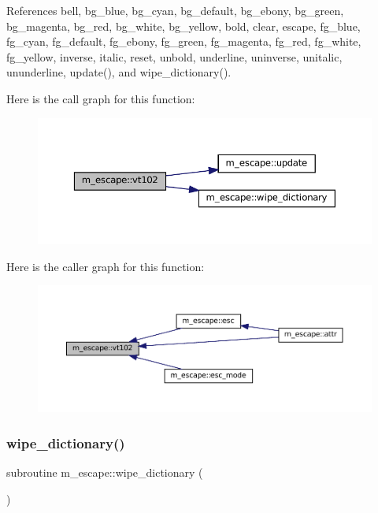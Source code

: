 References bell, bg\+\_\+blue, bg\+\_\+cyan, bg\+\_\+default, bg\+\_\+ebony, bg\+\_\+green, bg\+\_\+magenta, bg\+\_\+red, bg\+\_\+white, bg\+\_\+yellow, bold, clear, escape, fg\+\_\+blue, fg\+\_\+cyan, fg\+\_\+default, fg\+\_\+ebony, fg\+\_\+green, fg\+\_\+magenta, fg\+\_\+red, fg\+\_\+white, fg\+\_\+yellow, inverse, italic, reset, unbold, underline, uninverse, unitalic, ununderline, update(), and wipe\+\_\+dictionary().

Here is the call graph for this function\+:\nopagebreak
\begin{figure}[H]
\begin{center}
\leavevmode
\includegraphics[width=350pt]{namespacem__escape_ae9d40717b2e75e90e2505d5fed6435c5_cgraph}
\end{center}
\end{figure}
Here is the caller graph for this function\+:\nopagebreak
\begin{figure}[H]
\begin{center}
\leavevmode
\includegraphics[width=350pt]{namespacem__escape_ae9d40717b2e75e90e2505d5fed6435c5_icgraph}
\end{center}
\end{figure}
\mbox{\label{namespacem__escape_a1bc574bc97157fe67d868d2bd180c91e}} 
\subsubsection{\texorpdfstring{wipe\+\_\+dictionary()}{wipe\_dictionary()}}
{\footnotesize\ttfamily subroutine m\+\_\+escape\+::wipe\+\_\+dictionary (\begin{DoxyParamCaption}{ }\end{DoxyParamCaption})\hspace{0.3cm}{\ttfamily [private]}}



